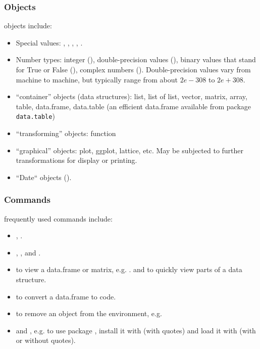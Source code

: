 \begin{frame}[fragile]
\frametitle{\Rlogo Objects}
\Rlogo objects include:
\begin{itemize}
\item Special values: , , , , .
\item Number types: integer (), double-precision values (), binary values that stand for True or False (), complex numbers (). Double-precision values vary from machine to machine, but typically range from about $2e-308$ to $2e+308$.
\item ``container'' objects (data structures):  list, list of list, vector, matrix, array, table, data.frame, data.table (an efficient data.frame available from package \texttt{data.table})
\item ``transforming'' objects: function
\item ``graphical'' objects: plot, ggplot, lattice, etc. May be subjected to further transformations for display or printing.
\item ``Date`` objects ().
\end{itemize}
\end{frame}


\begin{frame}[fragile]
\frametitle{\Rlogo Commands}
\Rlogo frequently used commands include:
\begin{itemize}
\item {}, .
\item {}, ,  and .
\item {} to view a data.frame or matrix, e.g. .  and  to quickly view parts of a data structure.
\item {} to convert a data.frame to \Rlogo code.
\item {} to remove an object from the environment, e.g. 
\item {} and , e.g. to use package , install it with  (with quotes) and load it with  (with or without quotes).
\end{itemize}
\end{frame}


